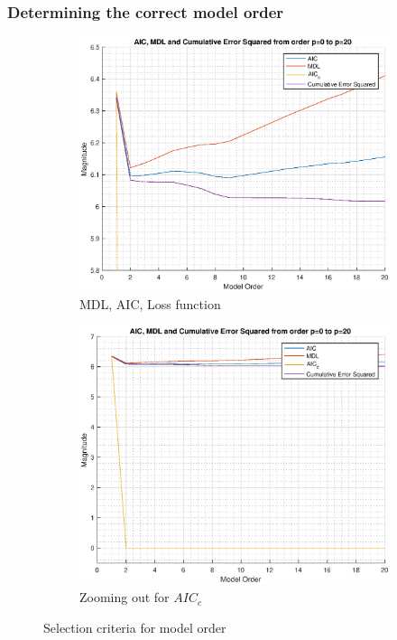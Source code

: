 \subsubsection{Determining the correct model order}

\begin{figure}[h!]
\centering
\begin{subfigure}{0.32\textwidth}
\centering
\includegraphics[width = \textwidth]{mdl_aic_zoom}
\caption{MDL, AIC, Loss function}
\label{fig:mdl_aic_zoom}
\end{subfigure}
\begin{subfigure}{0.32\textwidth}
\centering
\includegraphics[width = \textwidth]{mdl_aic}
\caption{Zooming out for $AIC_c$}
\label{fig:mdl_aic}
\end{subfigure}
\caption{Selection criteria for model order}
\label{yule_pcf}
\end{figure}

